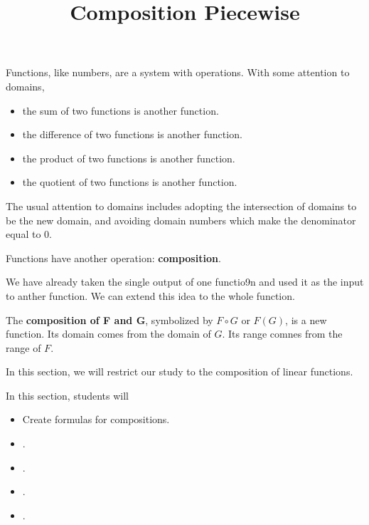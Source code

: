 \documentclass{ximera}
\title{Composition Piecewise}
\begin{document}
\begin{abstract}
\end{abstract}
\maketitle




Functions, like numbers, are a system with operations.  With some attention to domains,

\begin{itemize}
\item the sum of two functions is another function.
\item the difference of two functions is another function.
\item the product of two functions is another function.
\item the quotient of two functions is another function.
\end{itemize}


The usual attention to domains includes adopting the intersection of domains to be the new domain, and avoiding domain numbers which make the denominator equal to $0$.



Functions have another operation: \textbf{composition}.

We have already taken the single output of one functio9n and used it as the input to anther function.  We can extend this idea to the whole function.


The \textbf{composition of F and G}, symbolized by $F \circ G$ or $F(G)$, is a new function.  Its domain comes from the domain of $G$. Its range comnes from the range of $F$.



In this section, we will restrict our study to the composition of linear functions.


















\begin{sectionOutcomes}
In this section, students will 

\begin{itemize}
\item Create formulas for compositions.
\item .
\item .
\item .
\item .
\end{itemize}
\end{sectionOutcomes}
\end{document}
